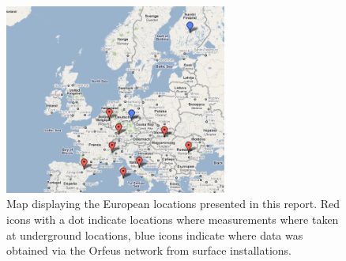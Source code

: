 \begin{figure}[h]
	\begin{center}
		\includegraphics[width=0.65\textwidth]{./Sec_SiteInfra/Figures/map}\hspace{1pc}%
		\caption{Map displaying  the European locations presented in this report. Red icons with a dot indicate locations where measurements where taken at underground locations, blue icons indicate where data was obtained via the Orfeus network from surface installations.}
		\label{Fig:map}
	\end{center}
\end{figure}

